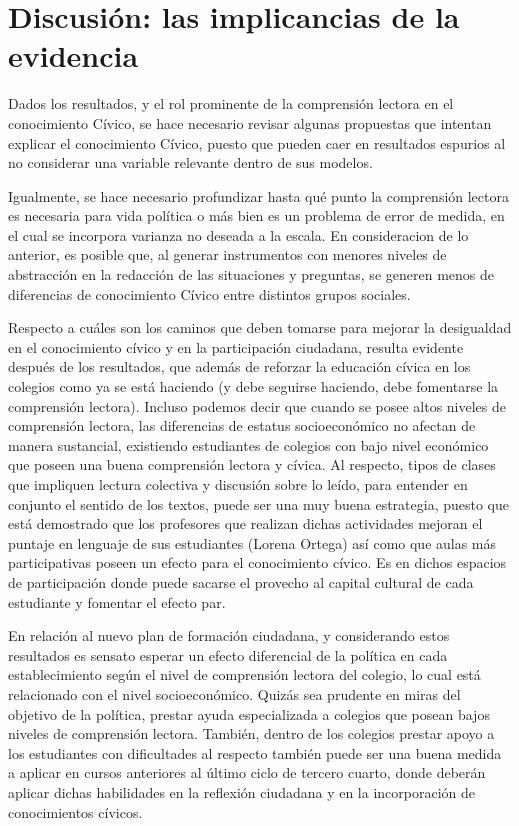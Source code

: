 \documentclass[
]{article}
\begin{document}
\hypertarget{discusiuxf3n-las-implicancias-de-la-evidencia}{%
\section{Discusión: las implicancias de la
evidencia}\label{discusiuxf3n-las-implicancias-de-la-evidencia}}

Dados los resultados, y el rol prominente de la comprensión lectora en
el conocimiento Cívico, se hace necesario revisar algunas propuestas que
intentan explicar el conocimiento Cívico, puesto que pueden caer en
resultados espurios al no considerar una variable relevante dentro de
sus modelos.

Igualmente, se hace necesario profundizar hasta qué punto la comprensión
lectora es necesaria para vida política o más bien es un problema de
error de medida, en el cual se incorpora varianza no deseada a la
escala. En consideracion de lo anterior, es posible que, al generar
instrumentos con menores niveles de abstracción en la redacción de las
situaciones y preguntas, se generen menos de diferencias de conocimiento
Cívico entre distintos grupos sociales.

Respecto a cuáles son los caminos que deben tomarse para mejorar la
desigualdad en el conocimiento cívico y en la participación ciudadana,
resulta evidente después de los resultados, que además de reforzar la
educación cívica en los colegios como ya se está haciendo (y debe
seguirse haciendo, debe fomentarse la comprensión lectora). Incluso
podemos decir que cuando se posee altos niveles de comprensión lectora,
las diferencias de estatus socioeconómico no afectan de manera
sustancial, existiendo estudiantes de colegios con bajo nivel económico
que poseen una buena comprensión lectora y cívica. Al respecto, tipos de
clases que impliquen lectura colectiva y discusión sobre lo leído, para
entender en conjunto el sentido de los textos, puede ser una muy buena
estrategia, puesto que está demostrado que los profesores que realizan
dichas actividades mejoran el puntaje en lenguaje de sus estudiantes
(Lorena Ortega) así como que aulas más participativas poseen un efecto
para el conocimiento cívico. Es en dichos espacios de participación
donde puede sacarse el provecho al capital cultural de cada estudiante y
fomentar el efecto par.

En relación al nuevo plan de formación ciudadana, y considerando estos
resultados es sensato esperar un efecto diferencial de la política en
cada establecimiento según el nivel de comprensión lectora del colegio,
lo cual está relacionado con el nivel socioeconómico. Quizás sea
prudente en miras del objetivo de la política, prestar ayuda
especializada a colegios que posean bajos niveles de comprensión
lectora. También, dentro de los colegios prestar apoyo a los estudiantes
con dificultades al respecto también puede ser una buena medida a
aplicar en cursos anteriores al último ciclo de tercero cuarto, donde
deberán aplicar dichas habilidades en la reflexión ciudadana y en la
incorporación de conocimientos cívicos.
\end{document}

